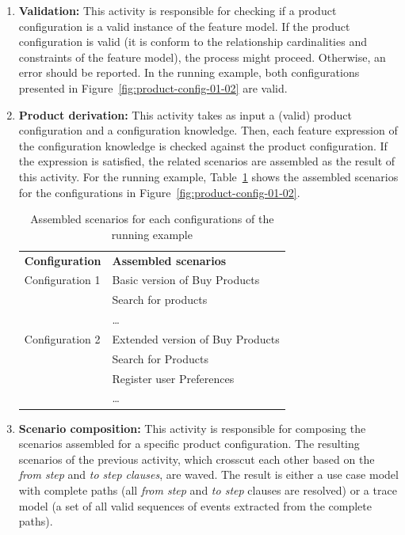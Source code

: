 \documentclass{llncs}
\begin{document}
\begin{enumerate}
\item {\bf Validation:} This activity is responsible for checking if a product configuration is a valid instance of the feature model. If the product configuration is 
valid (it is conform to the relationship cardinalities and constraints of the feature model), the process might proceed. Otherwise, an error should be reported. In the running example, both configurations presented in Figure~\ref{fig:product-config-01-02} are valid. 

\item {\bf Product derivation:} This activity takes as input a (valid) product configuration and a configuration knowledge. Then, each feature expression of the 
configuration knowledge is checked against the product configuration. If the expression is satisfied, the related scenarios are assembled as the result of 
this activity. For the running example, Table~\ref{tab:assembled-scenarios} shows the assembled scenarios for the configurations in  
Figure~\ref{fig:product-config-01-02}.

\begin{table}[h]
\begin{center}
\caption{Assembled scenarios for each configurations of the running example} \label{tab:assembled-scenarios}
\begin{tabular}{ll}
   \hline\noalign{\smallskip}
  {\bf Configuration} & {\bf Assembled scenarios} \\
   \noalign{\smallskip}
   \hline
   \noalign{\smallskip}
    Configuration 1\hspace{15pt} & Basic version of Buy Products \\
                             & Search for products \\
                             & \ldots \\
   Configuration 2 & Extended version of Buy Products \\
                             & Search for Products	 \\
                             & Register user Preferences \\
                             & \ldots       \\
  \hline
\end{tabular}
\end{center}
\end{table}
 
 \item {\bf Scenario composition:} This activity is responsible for composing the scenarios assembled for a specific product configuration. 
 The resulting scenarios of the previous activity, which crosscut each other based on the \emph{from step} and \emph{to step clauses}, are waved. The 
 result is either a use case model with complete paths (all \emph{from step} and \emph{to step} clauses are resolved) or a trace model (a set of all valid sequences of events extracted from the complete paths). 
 

\end{enumerate}
\end{document}

